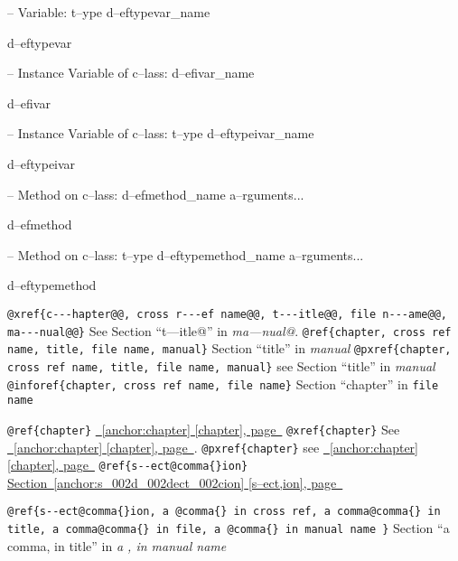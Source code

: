 \documentclass{book}
\begin{document}
\begin{titlepage}
\hbox{}-- Variable: t--ype d--eftypevar\_name


%
d--eftypevar

\hbox{}-- Instance Variable of c--lass: d--efivar\_name


%
d--efivar

\hbox{}-- Instance Variable of c--lass: t--ype d--eftypeivar\_name


%
d--eftypeivar

\hbox{}-- Method on c--lass: d--efmethod\_name a--rguments...


%
d--efmethod

\hbox{}-- Method on c--lass: t--ype d--eftypemethod\_name a--rguments...


%
d--eftypemethod

\texttt{@xref\{c{-}{-}{-}hapter@@, cross r{-}{-}{-}ef name@@, t{-}{-}{-}itle@@, file n{-}{-}{-}ame@@, ma{-}{-}{-}nual@@\}} See Section ``t---itle@'' in \textit{ma---nual@}.
\texttt{@ref\{chapter, cross ref name, title, file name, manual\}} Section ``title'' in \textit{manual}
\texttt{@pxref\{chapter, cross ref name, title, file name, manual\}} see Section ``title'' in \textit{manual}
\texttt{@inforef\{chapter, cross ref name, file name\}} Section ``chapter'' in \texttt{file name}

\texttt{@ref\{chapter\}} \hyperref[anchor:chapter]{\chaptername~\ref*{anchor:chapter} [chapter], page~\pageref*{anchor:chapter}}
\texttt{@xref\{chapter\}} See \hyperref[anchor:chapter]{\chaptername~\ref*{anchor:chapter} [chapter], page~\pageref*{anchor:chapter}}.
\texttt{@pxref\{chapter\}} see \hyperref[anchor:chapter]{\chaptername~\ref*{anchor:chapter} [chapter], page~\pageref*{anchor:chapter}}
\texttt{@ref\{s{-}{-}ect@comma\{\}ion\}} \hyperref[anchor:s_002d_002dect_002cion]{Section~\ref*{anchor:s_002d_002dect_002cion} [s--ect,ion], page~\pageref*{anchor:s_002d_002dect_002cion}}

\texttt{@ref\{s{-}{-}ect@comma\{\}ion, a @comma\{\} in cross
ref, a comma@comma\{\} in title, a comma@comma\{\} in file, a @comma\{\} in manual name \}}
Section ``a comma, in title'' in \textit{a , in manual name}


\end{titlepage}
\end{document}

